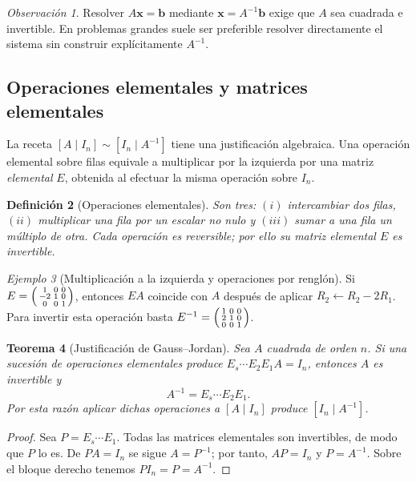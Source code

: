 \documentclass[12pt]{article}
\newtheorem{definicion}{Definición}[section]
\newtheorem{teorema}[definicion]{Teorema}
\theoremstyle{remark}
\newtheorem{observacion}[definicion]{Observación}
\newtheorem{ejemplo}[definicion]{Ejemplo}
\newcommand{\vect}[1]{\boldsymbol{#1}}
\begin{document}
\begin{observacion}
Resolver $A\vect{x}=\vect{b}$ mediante $\vect{x}=A^{-1}\vect{b}$ exige que $A$ sea cuadrada e invertible. En problemas grandes suele ser preferible resolver directamente el sistema sin construir explícitamente $A^{-1}$.
\end{observacion}

\subsection{Operaciones elementales y matrices elementales}
La receta $[A\mid I_n]\sim[I_n\mid A^{-1}]$ tiene una justificación algebraica. Una operación elemental sobre filas equivale a multiplicar por la izquierda por una matriz \emph{elemental} $E$, obtenida al efectuar la misma operación sobre $I_n$.
\begin{definicion}[Operaciones elementales]
Son tres: $(i)$ intercambiar dos filas, $(ii)$ multiplicar una fila por un escalar no nulo y $(iii)$ sumar a una fila un múltiplo de otra. Cada operación es reversible; por ello su matriz elemental $E$ es invertible.
\end{definicion}
\begin{ejemplo}[Multiplicación a la izquierda y operaciones por renglón]
Si $E=\begin{psmallmatrix}1&0&0\\-2&1&0\\0&0&1\end{psmallmatrix}$, entonces $EA$ coincide con $A$ después de aplicar $R_2\leftarrow R_2-2R_1$. Para invertir esta operación basta $E^{-1}=\begin{psmallmatrix}1&0&0\\2&1&0\\0&0&1\end{psmallmatrix}$.
\end{ejemplo}
\begin{teorema}[Justificación de Gauss--Jordan]
Sea $A$ cuadrada de orden $n$. Si una sucesión de operaciones elementales produce $E_s\cdots E_2E_1A=I_n$, entonces $A$ es invertible y
\[
\boxed{A^{-1}=E_s\cdots E_2E_1.}
\]
Por esta razón aplicar dichas operaciones a $[A\mid I_n]$ produce $[I_n\mid A^{-1}]$.
\end{teorema}
\begin{proof}
Sea $P=E_s\cdots E_1$. Todas las matrices elementales son invertibles, de modo que $P$ lo es. De $PA=I_n$ se sigue $A=P^{-1}$; por tanto, $AP=I_n$ y $P=A^{-1}$. Sobre el bloque derecho tenemos $PI_n=P=A^{-1}$.
\end{proof}
\end{document}

